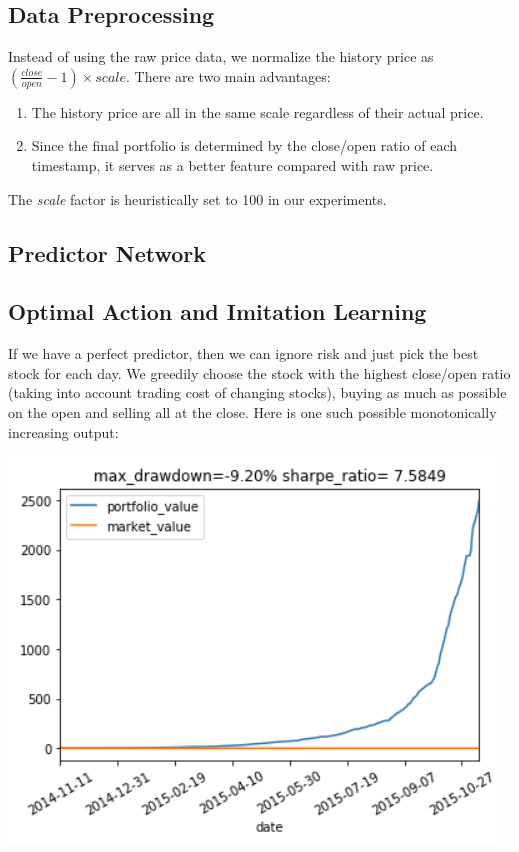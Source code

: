 \documentclass[a4paper, 10pt]{article}
\begin{document}
\begin{spacing}{1.2}
    \subsection{Data Preprocessing}
    Instead of using the raw price data, we normalize the history price as $(\frac{close}{open} - 1)\times scale$. There are two main advantages:
    \begin{enumerate}
      \item The history price are all in the same scale regardless of their actual price.
      \item Since the final portfolio is determined by the close/open ratio of each timestamp, it serves as a better feature compared with raw price.
    \end{enumerate}
    The \emph{scale} factor is heuristically set to 100 in our experiments.
    
    \subsection{Predictor Network}
    
    
    
    \subsection{Optimal Action and Imitation Learning}
    If we have a perfect predictor, then we can ignore risk and just pick the best stock for each day. We greedily choose the stock with the highest close/open ratio (taking into account trading cost of changing stocks), buying as much as possible on the open and selling all at the close. Here is one such possible monotonically increasing output: 
    
    \includegraphics[scale=0.5]{Optimal_with_trading_cost.png}
    

\end{spacing}
\end{document}
